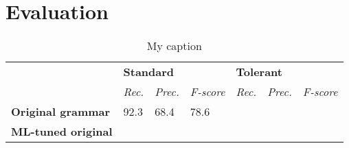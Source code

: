 \documentclass[11pt]{article}
\begin{document}


\section{Evaluation}

\begin{table*}[]
\centering
\caption{My caption}
\label{my-label}
\begin{tabular}{l|l|l|l|l|l|l|}
\cline{2-7}
                                                 & \multicolumn{3}{l|}{\textbf{Standard}}            & \multicolumn{3}{l|}{\textbf{Tolerant}}            \\ \cline{2-7} 
                                                 & \textit{Rec.} & \textit{Prec.} & \textit{F-score} & \textit{Rec.} & \textit{Prec.} & \textit{F-score} \\ \hline
\multicolumn{1}{|l|}{\textbf{Original grammar}}  & 92.3          & 68.4           & 78.6             &               &                &                  \\ \hline
\multicolumn{1}{|l|}{\textbf{ML-tuned original}} &               &                &                  &               &                &                  \\ \hline
\end{tabular}
\end{table*}







\end{document}
